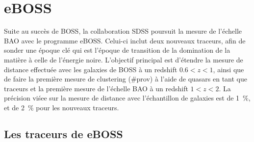 \documentclass[11pt, twoside, a4paper, openright]{report}
\begin{document}
\section{eBOSS}

Suite au succès de BOSS, la collaboration SDSS poursuit la mesure de l'échelle BAO avec le programme eBOSS. Celui-ci inclut deux nouveaux traceurs, afin de sonder une époque clé qui est l'époque de transition de la domination de la matière à celle de l'énergie noire.
L'objectif principal est d'étendre la mesure de distance effectuée avec les galaxies de BOSS à un redshift $\num{0,6} < z < \num{1}$, ainsi que de faire la première mesure de clustering (\#prov) à l'aide de quasars en tant que traceurs et la première mesure de l'échelle BAO à un redshift $1 < z < 2$.
La précision viśee sur la mesure de distance avec l'échantillon de galaxies est de \SI{1}{\percent}, et de \SI{2}{\percent} pour les nouveaux traceurs.



\subsection{Les traceurs de eBOSS}
\end{document}

